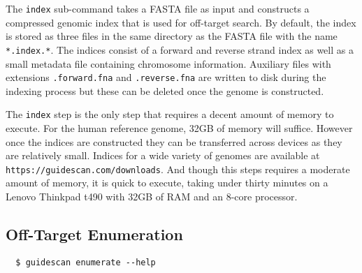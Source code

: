 \documentclass[10pt]{article}
\begin{document}
The \texttt{index} sub-command takes a FASTA file as input and
constructs a compressed genomic index that is used for off-target
search. By default, the index is stored as three files in the same
directory as the FASTA file with the name \texttt{*.index.*}. The
indices consist of a forward and reverse strand index as well as a
small metadata file containing chromosome information. Auxiliary files
with extensions \texttt{.forward.fna} and \texttt{.reverse.fna} are
written to disk during the indexing process but these can be deleted
once the genome is constructed.

The \texttt{index} step is the only step that requires a decent amount
of memory to execute. For the human reference genome, 32GB of memory
will suffice. However once the indices are constructed they can be
transferred across devices as they are relatively small. Indices for a
wide variety of genomes are available at
\texttt{https://guidescan.com/downloads}. And though this steps
requires a moderate amount of memory, it is quick to execute, taking
under thirty minutes on a Lenovo Thinkpad t490 with 32GB of RAM and an
8-core processor.

\subsection{Off-Target Enumeration}
\begin{verbatim}
  $ guidescan enumerate --help
\end{verbatim}
\end{document}

